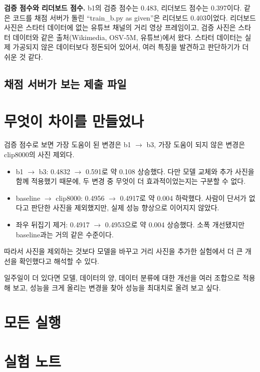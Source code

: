 \documentclass[11pt]{article}
\begin{document}
\textbf{검증 점수와 리더보드 점수.} b1의 검증 점수는 0.483, 리더보드 점수는 0.397이다.
같은 코드를 채점 서버가 돌린 ``train\_b.py as given''은 리더보드 0.403이었다. 리더보드 사진은
스타터 데이터에 없는 유튜브 채널의 거리 영상 프레임이고, 검증 사진은 스타터 데이터와 같은
출처(Wikimedia, OSV-5M, 유튜브)에서 왔다. 스타터 데이터는 실제 가공되지 않은 데이터보다 정돈되어 있어서, 여러 특징을 발견하고 판단하기가 더 쉬운 것 같다.

\subsection*{채점 서버가 보는 제출 파일}

\section*{무엇이 차이를 만들었나}

검증 점수로 보면 가장 도움이 된 변경은 b1 $\rightarrow$ b3, 가장 도움이 되지 않은 변경은
clip8000의 사진 제외다.
\begin{itemize}
\item b1 $\rightarrow$ b3: 0.4832 $\rightarrow$ 0.591로 약 0.108 상승했다. 다만 모델 교체와 추가
  사진을 함께 적용했기 때문에, 두 변경 중 무엇이 더 효과적이었는지는 구분할 수 없다.
\item baseline $\rightarrow$ clip8000: 0.4956 $\rightarrow$ 0.4917로 약 0.004 하락했다. 사람이
  단서가 없다고 판단한 사진을 제외했지만, 실제 성능 향상으로 이어지지 않았다.
\item 좌우 뒤집기 제거: 0.4917 $\rightarrow$ 0.4953으로 약 0.004 상승했다. 소폭 개선됐지만
  baseline과는 거의 같은 수준이다.
\end{itemize}
따라서 사진을 제외하는 것보다 모델을 바꾸고 거리 사진을 추가한 실험에서 더 큰 개선을 확인했다고
해석할 수 있다.

일주일이 더 있다면 모델, 데이터의 양, 데이터 분류에 대한 개선을 여러 조합으로 적용해 보고, 성능을 크게 올리는 변경을 찾아 성능을 최대치로 올려 보고 싶다.

\section*{모든 실행}

\section*{실험 노트}
\end{document}

